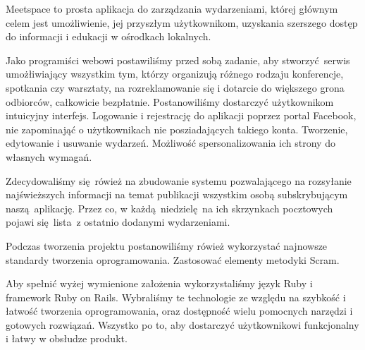 Meetspace to prosta aplikacja do zarządzania wydarzeniami, której głównym celem jest umożliwienie, jej przyszłym użytkownikom, uzyskania szerszego dostęp do informacji i edukacji w ośrodkach lokalnych.


Jako programiści webowi postawiliśmy przed sobą zadanie, aby stworzyć serwis umożłiwiający wszystkim tym, którzy organizują różnego rodzaju konferencje, spotkania czy warsztaty, na rozreklamowanie się i dotarcie do większego grona odbiorców, całkowicie bezpłatnie. Postanowiliśmy dostarczyć użytkownikom intuicyjny interfejs.  Logowanie i rejestrację do aplikacji poprzez portal Facebook, nie zapominająć o użytkownikach nie posziadających takiego konta. Tworzenie, edytowanie i usuwanie wydarzeń. Możliwość spersonalizowania ich strony do własnych wymagań.


Zdecydowaliśmy się rówież na zbudowanie systemu pozwalającego na rozsyłanie najświeższych informacji na temat publikacji wszystkim osobą subskrybującym naszą aplikację. Przez co, w każdą niedzielę na ich skrzynkach pocztowych pojawi się lista z ostatnio dodanymi wydarzeniami.

Podczas tworzenia projektu postanowiliśmy rówież wykorzystać najnowsze standardy tworzenia oprogramowania. Zastosować elementy metodyki Scram.

Aby spełnić wyżej wymienione założenia wykorzystaliśmy język Ruby i framework Ruby on Rails. Wybraliśmy te technologie ze względu na szybkość i łatwość tworzenia oprogramowania, oraz dostępność wielu pomocnych narzędzi i gotowych rozwiązań. Wszystko po to, aby dostarczyć użytkownikowi funkcjonalny i łatwy w obsłudze produkt.

